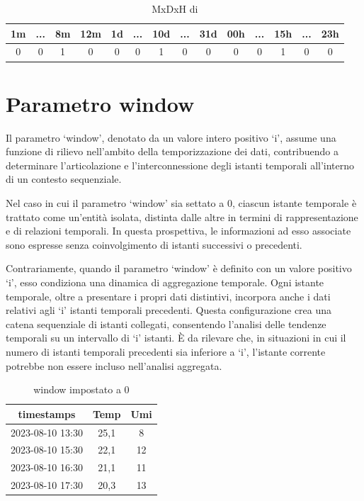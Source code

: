 \documentclass{rapportECL}
\begin{document}
\begin{table}[h]\centering
  \begin{tabular}{|*{14}{c|}}
  
  \hline
  1m & ... & 8m & 12m & 1d & ... & 10d & ... & 31d & 00h & ... & 15h & ... & 23h\\
  \hline
  0 & 0 & 1 & 0 & 0 & 0 & 1 & 0 & 0 & 0 & 0 & 1 & 0 & 0\\
  \hline
  
  \end{tabular}
  
  \caption{MxDxH di  }
\end{table}

\section{Parametro window}
\label{win}

Il parametro `window', denotato da un valore intero positivo `i', assume una funzione di rilievo nell'ambito della temporizzazione dei dati, 
contribuendo a determinare l'articolazione e l'interconnessione degli istanti temporali all'interno di un contesto sequenziale.

Nel caso in cui il parametro `window' sia settato a 0, ciascun istante temporale è trattato come un'entità isolata, distinta dalle altre in termini 
di rappresentazione e di relazioni temporali. In questa prospettiva, le informazioni ad esso associate sono espresse senza coinvolgimento di 
istanti successivi o precedenti.

Contrariamente, quando il parametro `window' è definito con un valore positivo `i', esso condiziona una dinamica di aggregazione temporale. 
Ogni istante temporale, oltre a presentare i propri dati distintivi, incorpora anche i dati relativi agli `i' istanti temporali precedenti. 
Questa configurazione crea una catena sequenziale di istanti collegati, consentendo l'analisi delle tendenze temporali su un intervallo di `i' istanti. 
È da rilevare che, in situazioni in cui il numero di istanti temporali precedenti sia inferiore a `i', 
l'istante corrente potrebbe non essere incluso nell'analisi aggregata.



\begin{table}[h]
  \centering
  \begin{tabular}{|c|c|c|}

    \hline
    timestamps & Temp & Umi\\
    \hline
    2023-08-10 13:30 & 25,1 & 8\\
    \hline
    2023-08-10 15:30 & 22,1 & 12\\
    \hline
    2023-08-10 16:30 & 21,1 & 11\\
    \hline
    2023-08-10 17:30 & 20,3 & 13\\
    \hline
  
  \end{tabular}
  
  \caption{window impostato a 0}
\end{table}
\end{document}
